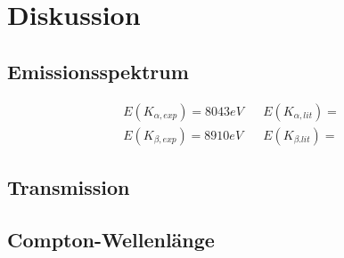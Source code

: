 \section{Diskussion}
\label{sec:Diskussion}

\subsection{Emissionsspektrum}
\label{subsec:disk_emission}

\begin{align*}
   
    E(K_{\alpha,exp}) = 8043 eV &&  E(K_{\alpha,lit}) = \\
    E(K_{\beta,exp}) = 8910 eV  &&  E(K_{\beta.lit}) = 
\end{align*}


\subsection{Transmission}
\label{subsec:transm}

\subsection{Compton-Wellenlänge}
\label{subsec:disk_compton}